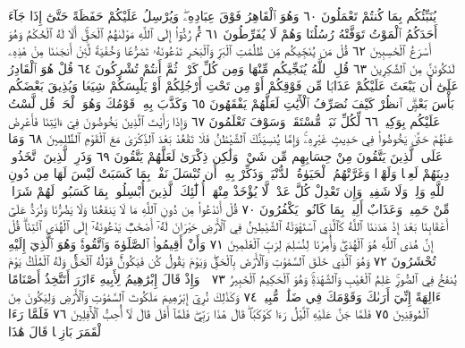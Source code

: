 يُنَبِّئُكُم بِمَا كُنتُمْ تَعْمَلُونَ ٦٠ وَهُوَ ٱلْقَاهِرُ فَوْقَ عِبَادِهِۦۖ
وَيُرْسِلُ عَلَيْكُمْ حَفَظَةً حَتَّىٰٓ إِذَا جَآءَ أَحَدَكُمُ ٱلْمَوْتُ تَوَفَّتْهُ
رُسُلُنَا وَهُمْ لَا يُفَرِّطُونَ ٦١ ثُمَّ رُدُّوٓا۟ إِلَى ٱللَّهِ مَوْلَىٰهُمُ ٱلْحَقِّۚ
أَلَا لَهُ ٱلْحُكْمُ وَهُوَ أَسْرَعُ ٱلْحَٰسِبِينَ ٦٢ قُلْ مَن يُنَجِّيكُم مِّن
ظُلُمَٰتِ ٱلْبَرِّ وَٱلْبَحْرِ تَدْعُونَهُۥ تَضَرُّعࣰا وَخُفْيَةࣰ لَّئِنْ أَنجَىٰنَا مِنْ
هَٰذِهِۦ لَنَكُونَنَّ مِنَ ٱلشَّٰكِرِينَ ٦٣ قُلِ ٱللَّهُ يُنَجِّيكُم مِّنْهَا وَمِن كُلِّ كَرْبࣲ
ثُمَّ أَنتُمْ تُشْرِكُونَ ٦٤ قُلْ هُوَ ٱلْقَادِرُ عَلَىٰٓ أَن يَبْعَثَ عَلَيْكُمْ عَذَابࣰا مِّن
فَوْقِكُمْ أَوْ مِن تَحْتِ أَرْجُلِكُمْ أَوْ يَلْبِسَكُمْ شِيَعࣰا وَيُذِيقَ بَعْضَكُم
بَأْسَ بَعْضٍۗ ٱنظُرْ كَيْفَ نُصَرِّفُ ٱلْأٓيَٰتِ لَعَلَّهُمْ يَفْقَهُونَ ٦٥ وَكَذَّبَ
بِهِۦ قَوْمُكَ وَهُوَ ٱلْحَقُّۚ قُل لَّسْتُ عَلَيْكُم بِوَكِيلࣲ ٦٦ لِّكُلِّ نَبَإࣲ
مُّسْتَقَرࣱّۚ وَسَوْفَ تَعْلَمُونَ ٦٧ وَإِذَا رَأَيْتَ ٱلَّذِينَ يَخُوضُونَ فِيٓ ءَايَٰتِنَا
فَأَعْرِضْ عَنْهُمْ حَتَّىٰ يَخُوضُوا۟ فِي حَدِيثٍ غَيْرِهِۦۚ وَإِمَّا يُنسِيَنَّكَ
ٱلشَّيْطَٰنُ فَلَا تَقْعُدْ بَعْدَ ٱلذِّكْرَىٰ مَعَ ٱلْقَوْمِ ٱلظَّٰلِمِينَ ٦٨
وَمَا عَلَى ٱلَّذِينَ يَتَّقُونَ مِنْ حِسَابِهِم مِّن شَيْءࣲ وَلَٰكِن
ذِكْرَىٰ لَعَلَّهُمْ يَتَّقُونَ ٦٩ وَذَرِ ٱلَّذِينَ ٱتَّخَذُوا۟ دِينَهُمْ
لَعِبࣰا وَلَهْوࣰا وَغَرَّتْهُمُ ٱلْحَيَوٰةُ ٱلدُّنْيَاۚ وَذَكِّرْ بِهِۦٓ أَن
تُبْسَلَ نَفْسُۢ بِمَا كَسَبَتْ لَيْسَ لَهَا مِن دُونِ ٱللَّهِ وَلِيࣱّ
وَلَا شَفِيعࣱ وَإِن تَعْدِلْ كُلَّ عَدْلࣲ لَّا يُؤْخَذْ مِنْهَآۗ أُو۟لَٰٓئِكَ
ٱلَّذِينَ أُبْسِلُوا۟ بِمَا كَسَبُوا۟ۖ لَهُمْ شَرَابࣱ مِّنْ حَمِيمࣲ
وَعَذَابٌ أَلِيمُۢ بِمَا كَانُوا۟ يَكْفُرُونَ ٧٠ قُلْ أَنَدْعُوا۟ مِن دُونِ
ٱللَّهِ مَا لَا يَنفَعُنَا وَلَا يَضُرُّنَا وَنُرَدُّ عَلَىٰٓ أَعْقَابِنَا بَعْدَ إِذْ
هَدَىٰنَا ٱللَّهُ كَٱلَّذِي ٱسْتَهْوَتْهُ ٱلشَّيَٰطِينُ فِي ٱلْأَرْضِ
حَيْرَانَ لَهُۥٓ أَصْحَٰبࣱ يَدْعُونَهُۥٓ إِلَى ٱلْهُدَى ٱئْتِنَاۗ قُلْ إِنَّ
هُدَى ٱللَّهِ هُوَ ٱلْهُدَىٰۖ وَأُمِرْنَا لِنُسْلِمَ لِرَبِّ ٱلْعَٰلَمِينَ ٧١ وَأَنْ
أَقِيمُوا۟ ٱلصَّلَوٰةَ وَٱتَّقُوهُۚ وَهُوَ ٱلَّذِيٓ إِلَيْهِ تُحْشَرُونَ ٧٢ وَهُوَ
ٱلَّذِي خَلَقَ ٱلسَّمَٰوَٰتِ وَٱلْأَرْضَ بِٱلْحَقِّۖ وَيَوْمَ يَقُولُ كُن
فَيَكُونُۚ قَوْلُهُ ٱلْحَقُّۚ وَلَهُ ٱلْمُلْكُ يَوْمَ يُنفَخُ فِي ٱلصُّورِۚ
عَٰلِمُ ٱلْغَيْبِ وَٱلشَّهَٰدَةِۚ وَهُوَ ٱلْحَكِيمُ ٱلْخَبِيرُ ٧٣
۞ وَإِذْ قَالَ إِبْرَٰهِيمُ لِأَبِيهِ ءَازَرَ أَتَتَّخِذُ أَصْنَامًا ءَالِهَةً إِنِّيٓ
أَرَىٰكَ وَقَوْمَكَ فِي ضَلَٰلࣲ مُّبِينࣲ ٧٤ وَكَذَٰلِكَ نُرِيٓ إِبْرَٰهِيمَ
مَلَكُوتَ ٱلسَّمَٰوَٰتِ وَٱلْأَرْضِ وَلِيَكُونَ مِنَ ٱلْمُوقِنِينَ ٧٥
فَلَمَّا جَنَّ عَلَيْهِ ٱلَّيْلُ رَءَا كَوْكَبࣰاۖ قَالَ هَٰذَا رَبِّيۖ فَلَمَّآ أَفَلَ
قَالَ لَآ أُحِبُّ ٱلْأٓفِلِينَ ٧٦ فَلَمَّا رَءَا ٱلْقَمَرَ بَازِغࣰا قَالَ هَٰذَا
